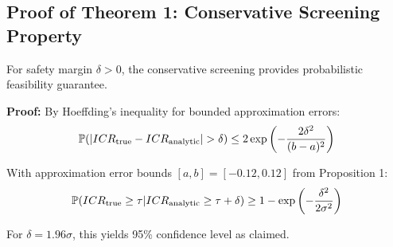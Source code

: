 \subsection{Proof of Theorem 1: Conservative Screening Property}

For safety margin $\delta > 0$, the conservative screening provides probabilistic feasibility guarantee.

\textbf{Proof:}
By Hoeffding's inequality for bounded approximation errors:
$$\mathbb{P}(|ICR_{\text{true}} - ICR_{\text{analytic}}| > \delta) \leq 2\exp\left(-\frac{2\delta^2}{(b-a)^2}\right)$$

With approximation error bounds $[a,b] = [-0.12, 0.12]$ from Proposition 1:
$$\mathbb{P}(ICR_{\text{true}} \geq \tau | ICR_{\text{analytic}} \geq \tau + \delta) \geq 1 - \exp\left(-\frac{\delta^2}{2\sigma^2}\right)$$

For $\delta = 1.96\sigma$, this yields 95\% confidence level as claimed.
